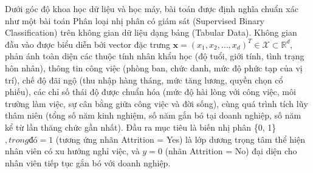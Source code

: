 \documentclass[12pt,a4paper]{article}
\begin{document}
Dưới góc độ khoa học dữ liệu và học máy, bài toán được định nghĩa chuẩn xác như một bài toán Phân loại nhị phân có giám sát (Supervised Binary Classification) trên không gian dữ liệu dạng bảng (Tabular Data). Không gian đầu vào được biểu diễn bởi vector đặc trưng $\mathbf{x} = (x_1, x_2, \dots, x_d)^T \in \mathcal{X} \subset \mathbb{R}^d$, phản ánh toàn diện các thuộc tính nhân khẩu học (độ tuổi, giới tính, tình trạng hôn nhân), thông tin công việc (phòng ban, chức danh, mức độ phức tạp của vị trí), chế độ đãi ngộ (thu nhập hàng tháng, mức tăng lương, quyền chọn cổ phiếu), các chỉ số thái độ được chuẩn hóa (mức độ hài lòng với công việc, môi trường làm việc, sự cân bằng giữa công việc và đời sống), cùng quá trình tích lũy thâm niên (tổng số năm kinh nghiệm, số năm gắn bó tại doanh nghiệp, số năm kể từ lần thăng chức gần nhất). Đầu ra mục tiêu là biến nhị phân  \in \{0, 1\}$, trong đó  = 1$ (tương ứng nhãn Attrition = Yes) là lớp dương trọng tâm thể hiện nhân viên có xu hướng nghỉ việc, và $y = 0$ (nhãn Attrition = No) đại diện cho nhân viên tiếp tục gắn bó với doanh nghiệp.\n
\end{document}
